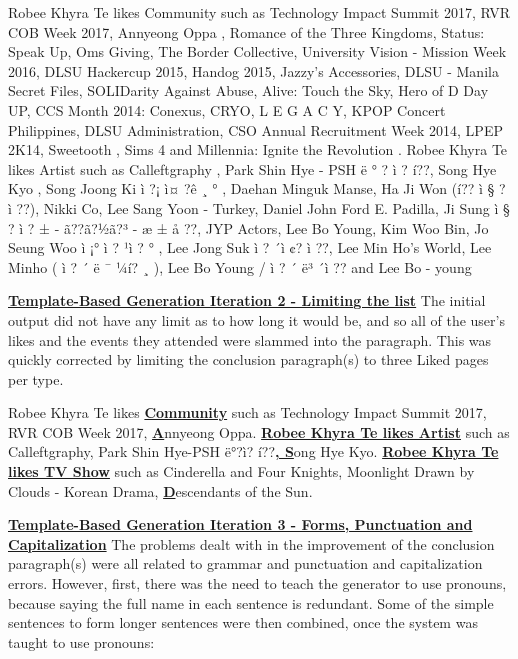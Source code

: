 \begin{center} Robee Khyra Te likes Community such as Technology Impact Summit 2017, RVR COB Week 2017, Annyeong Oppa , Romance of the Three Kingdoms, Status: Speak Up, Oms Giving, The Border Collective, University Vision - Mission Week 2016, DLSU Hackercup 2015, Handog 2015, Jazzy's Accessories, DLSU - Manila Secret Files, SOLIDarity Against Abuse, Alive: Touch the Sky, Hero of D Day UP, CCS Month 2014: Conexus, CRYO, L E G A C Y, KPOP Concert Philippines, DLSU Administration, CSO Annual Recruitment Week 2014, LPEP 2K14, Sweetooth , Sims 4 and Millennia: Ignite the Revolution . Robee Khyra Te likes Artist such as Calleftgraphy , Park Shin Hye - PSH ë ° ? ì ? í??, Song Hye Kyo , Song Joong Ki ì ?¡ ì¤ ?ê ¸ ° , Daehan Minguk Manse, Ha Ji Won (í?? ì § ? ì ??), Nikki Co, Lee Sang Yoon - Turkey, Daniel John Ford E. Padilla, Ji Sung ì § ? ì ? ± - ã??ã?½ã?³ - æ ± å ??, JYP Actors, Lee Bo Young, Kim Woo Bin, Jo Seung Woo ì ¡° ì ? ¹ì ? ° , Lee Jong Suk ì ? ´ì ¢? ì ??, Lee Min Ho's World, Lee Minho ( ì ? ´ ë ¯ ¼í? ¸ ), Lee Bo Young / ì ? ´ ë³ ´ì ?? and Lee Bo - young
\end{center}

\underline{\textbf{Template-Based Generation Iteration 2 - Limiting the list}} \newline
The initial output did not have any limit as to how long it would be, and so all of the user’s likes and the events they attended were slammed into the paragraph. This was quickly corrected by limiting the conclusion paragraph(s) to three Liked pages per type.

\begin{center} Robee Khyra Te likes \underline{\textbf{Community}} such as Technology Impact Summit 2017, RVR COB Week 2017, \underline{\textbf{A}}nnyeong Oppa. \newline
	\underline{\textbf{Robee Khyra Te likes Artist}} such as Calleftgraphy, Park Shin Hye-PSH ë°?ì? í??\underline{\textbf{, S}}ong Hye Kyo. \newline
	\underline{\textbf{Robee Khyra Te likes TV Show}} such as Cinderella and Four Knights, Moonlight Drawn by Clouds - Korean Drama, \underline{\textbf{D}}escendants of the Sun. \end{center}

\underline{\textbf{Template-Based Generation Iteration 3 - Forms, Punctuation and Capitalization}} \newline
The problems dealt with in the improvement of the conclusion paragraph(s) were all related to grammar and punctuation and capitalization errors. However, first, there was the need to teach the generator to use pronouns, because saying the full name in each sentence is redundant. Some of the simple sentences to form longer sentences were then combined, once the system was taught to use pronouns:

